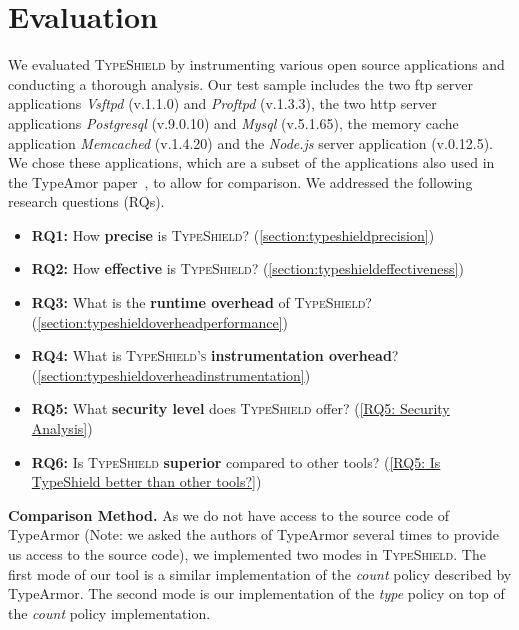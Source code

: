 \section{Evaluation}
\label{chapter:Evaluation}
We evaluated \textsc{TypeShield} by instrumenting various open source applications and conducting a thorough analysis. Our test sample includes the two ftp server applications \textit{Vsftpd} (v.1.1.0) and \textit{Proftpd} (v.1.3.3), the two http server 
applications \textit{Postgresql} (v.9.0.10) and \textit{Mysql} (v.5.1.65), the memory cache application \textit{Memcached} (v.1.4.20) and the \textit{Node.js} server application (v.0.12.5). We chose these applications, which are a subset of the applications also used in the TypeAmor paper~\cite{veen:typearmor}, to allow for comparison. We addressed the following research questions (RQs).

\begin{itemize}[leftmargin=.12in]
 \item \textbf{RQ1:} How \textbf{precise} is \textsc{TypeShield}? (\cref{section:typeshieldprecision})
 \item \textbf{RQ2:} How \textbf{effective} is \textsc{TypeShield}? (\cref{section:typeshieldeffectiveness})
 \item \textbf{RQ3:} What is the \textbf{runtime overhead} of \textsc{TypeShield}? (\cref{section:typeshieldoverheadperformance})
 \item \textbf{RQ4:} What is \textsc{TypeShield's} \textbf{instrumentation overhead}? (\cref{section:typeshieldoverheadinstrumentation})
 \item \textbf{RQ5:} What \textbf{security level} does \textsc{TypeShield} offer? (\cref{RQ5: Security Analysis})
 \item \textbf{RQ6:} Is \textsc{TypeShield} \textbf{superior} compared to other tools? (\cref{RQ5: Is TypeShield better than other tools?})
\end{itemize}
\textbf{Comparison Method.} As we do not have access to the source code of TypeArmor (Note: we asked the authors of TypeArmor several times to provide us access to the source code), we implemented two modes in \textsc{TypeShield}. The first mode of our tool is a similar implementation of the \textit{count} policy described by TypeArmor. The second mode is our implementation of the \textit{type} policy on top of the \textit{count} policy implementation. 
%

